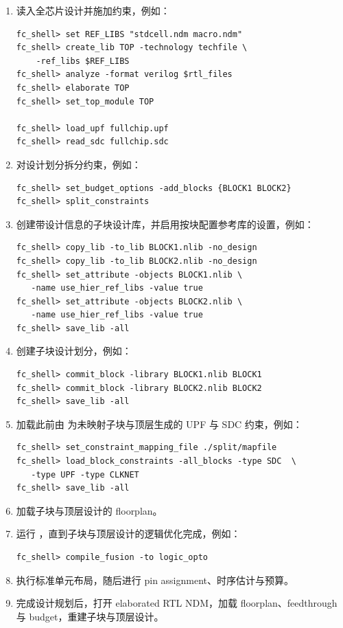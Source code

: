 \begin{enumerate}
  \item 读入全芯片设计并施加约束，例如：
\begin{lstlisting}
fc_shell> set REF_LIBS "stdcell.ndm macro.ndm"
fc_shell> create_lib TOP -technology techfile \
    -ref_libs $REF_LIBS
fc_shell> analyze -format verilog $rtl_files
fc_shell> elaborate TOP
fc_shell> set_top_module TOP

fc_shell> load_upf fullchip.upf
fc_shell> read_sdc fullchip.sdc
\end{lstlisting}

  \item 对设计划分拆分约束，例如：
\begin{lstlisting}
fc_shell> set_budget_options -add_blocks {BLOCK1 BLOCK2}
fc_shell> split_constraints
\end{lstlisting}

  \item 创建带设计信息的子块设计库，并启用按块配置参考库的设置，例如：
\begin{lstlisting}
fc_shell> copy_lib -to_lib BLOCK1.nlib -no_design
fc_shell> copy_lib -to_lib BLOCK2.nlib -no_design
fc_shell> set_attribute -objects BLOCK1.nlib \
   -name use_hier_ref_libs -value true
fc_shell> set_attribute -objects BLOCK2.nlib \
   -name use_hier_ref_libs -value true
fc_shell> save_lib -all
\end{lstlisting}

  \item 创建子块设计划分，例如：
\begin{lstlisting}
fc_shell> commit_block -library BLOCK1.nlib BLOCK1
fc_shell> commit_block -library BLOCK2.nlib BLOCK2
fc_shell> save_lib -all
\end{lstlisting}

  \item 加载此前由  为未映射子块与顶层生成的 UPF 与 SDC 约束，例如：
\begin{lstlisting}
fc_shell> set_constraint_mapping_file ./split/mapfile
fc_shell> load_block_constraints -all_blocks -type SDC  \
   -type UPF -type CLKNET
fc_shell> save_lib -all
\end{lstlisting}

  \item 加载子块与顶层设计的 floorplan。

  \item 运行 ，直到子块与顶层设计的逻辑优化完成，例如：
\begin{lstlisting}
fc_shell> compile_fusion -to logic_opto
\end{lstlisting}

  \item 执行标准单元布局，随后进行 pin assignment、时序估计与预算。

  \item 完成设计规划后，打开 elaborated RTL NDM，加载 floorplan、feedthrough 与 budget，重建子块与顶层设计。
\end{enumerate}

